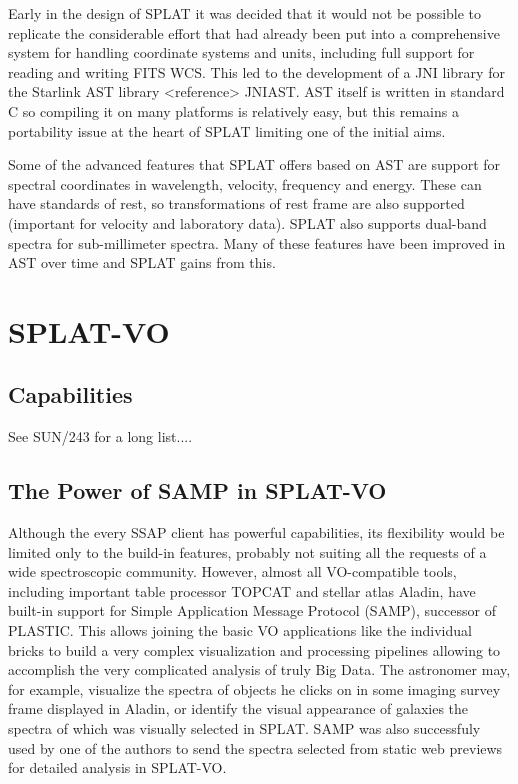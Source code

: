 \documentclass[final,authoryear,5p,times,twocolumn]{elsarticle}
\begin{document}
Early in the design of SPLAT it was decided that it would not be possible to
replicate the considerable effort that had already been put into a
comprehensive system for handling coordinate systems and units, including full
support for reading and writing FITS WCS. This led to the development of a JNI
library for the Starlink AST library <reference> JNIAST. AST itself is written
in standard C so compiling it on many platforms is relatively easy, but this
remains a portability issue at the heart of SPLAT limiting one of the initial
aims.

Some of the advanced features that SPLAT offers based on AST are support for
spectral coordinates in wavelength, velocity, frequency and energy. These can
have standards of rest, so transformations of rest frame are also supported
(important for velocity and laboratory data). SPLAT also supports dual-band
spectra for sub-millimeter spectra. Many of these features have been improved
in AST over time and SPLAT gains from this.


\section{SPLAT-VO}

\subsection{Capabilities}
See SUN/243 for a long list....


\subsection{The Power of SAMP in SPLAT-VO}

Although the every SSAP client has  powerful capabilities, its flexibility
would be limited only to the build-in features, probably not suiting all the
requests of a wide spectroscopic community. However, almost all VO-compatible
tools, including important table processor TOPCAT and stellar atlas Aladin,
have built-in support for Simple Application Message Protocol (SAMP), successor
of PLASTIC.  This allows joining the basic VO applications like the individual
bricks to build a very complex visualization and processing pipelines allowing
to accomplish the very complicated analysis of truly Big Data.  The astronomer
may, for example, visualize the spectra of objects he clicks on in some imaging
survey frame displayed in Aladin, or identify the visual appearance of galaxies
the spectra of which was visually selected in SPLAT.  SAMP was also successfuly
used by one of the authors to send the spectra selected from   static web
previews for detailed analysis in SPLAT-VO.
\end{document}
